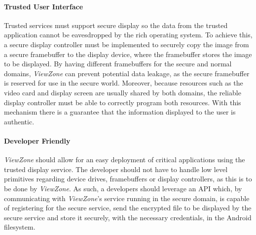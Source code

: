 \paragraph{\textbf{Trusted User Interface}}

Trusted services must support secure display so the data from the trusted application cannot be eavesdropped by the rich operating system. To achieve this, a secure display controller must be implemented to securely copy the image from a secure framebuffer to the display device, where the framebuffer stores the image to be displayed. By having different framebuffers for the secure and normal domains, \emph{ViewZone} can prevent potential data leakage, as the secure framebuffer is reserved for use in the secure world. Moreover, because resources such as the video card and display screen are usually shared by both domains, the reliable display controller must be able to correctly program both resources. With this mechanism there is a guarantee that the information displayed to the user is authentic.

\paragraph{\textbf{Developer Friendly}}

\emph{ViewZone} should allow for an easy deployment of critical applications using the trusted display service. The developer should not have to handle low level primitives regarding device drives, framebuffers or display controllers, as this is to be done by \emph{ViewZone}. As such, a developers should leverage an API which, by communicating with \emph{ViewZone}'s service running in the secure domain, is capable of registering for the secure service, send the encrypted file to be displayed by the secure service and store it securely, with the necessary credentials, in the Android filesystem.


